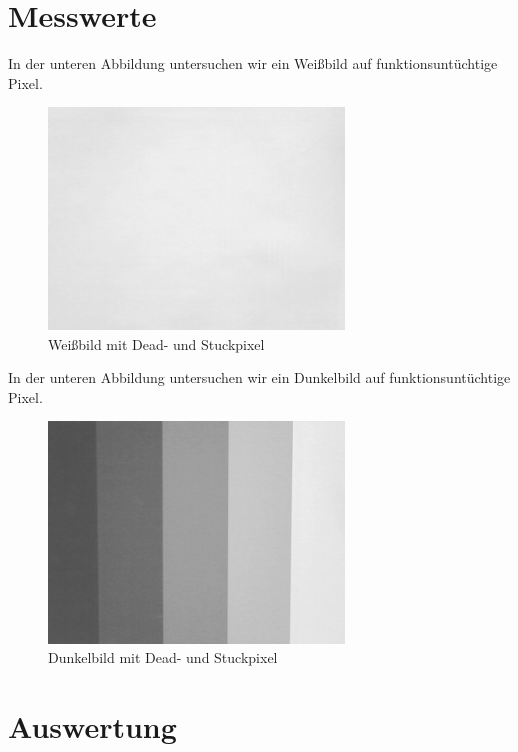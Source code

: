 \documentclass[12pt, oneside, a4paper, \docLanguage]{report}
\begin{document}
\newpage
\section{Messwerte}
\label{chap:VERSUCH_4_MESSWERTE}

In der unteren Abbildung untersuchen wir ein Weißbild auf funktionsuntüchtige Pixel.
\begin{figure}[hbt!]
	\centering\small
	\includegraphics[width=0.7\textwidth]{../data/zzz.png}
	\caption{Weißbild mit Dead- und Stuckpixel}
	\label{fig:Weißbild mit Dead- und Stuckpixel}
\end{figure}

In der unteren Abbildung untersuchen wir ein Dunkelbild auf funktionsuntüchtige Pixel.

\begin{figure}[hbt!]
	\centering\small
	\includegraphics[width=0.7\textwidth]{../data/zzz2.png}
	\caption{Dunkelbild mit Dead- und Stuckpixel}
	\label{fig:Dunkelbild mit Dead- und Stuckpixel}
\end{figure}
\newpage
\section{Auswertung}
\label{chap:VERSUCH_4_AUSWERTUNG}
\end{document}
